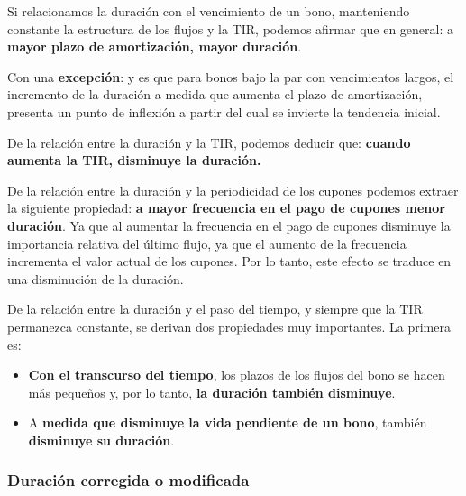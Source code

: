 \documentclass[
  letterpaper,
  DIV=11,
  numbers=noendperiod]{scrreprt}
\begin{document}
\begin{tcolorbox}
Si relacionamos la duración con el vencimiento de un bono, manteniendo
constante la estructura de los flujos y la TIR, podemos afirmar que en
general: a \textbf{mayor plazo de amortización, mayor duración}.

\begin{tcolorbox}[enhanced jigsaw, toprule=.15mm, left=2mm, arc=.35mm, breakable, bottomrule=.15mm, opacityback=0, rightrule=.15mm, leftrule=.75mm, colframe=quarto-callout-important-color-frame, colback=white]
\begin{minipage}[t]{5.5mm}
\textcolor{quarto-callout-important-color}{\faExclamation}
\end{minipage}%
\begin{minipage}[t]{\textwidth - 5.5mm}

Con una \textbf{excepción}: y es que para bonos bajo la par con
vencimientos largos, el incremento de la duración a medida que aumenta
el plazo de amortización, presenta un punto de inflexión a partir del
cual se invierte la tendencia inicial.

\end{minipage}%
\end{tcolorbox}

De la relación entre la duración y la TIR, podemos deducir que:
\textbf{cuando aumenta la TIR, disminuye la duración.}

De la relación entre la duración y la periodicidad de los cupones
podemos extraer la siguiente propiedad: \textbf{a mayor frecuencia en el
pago de cupones menor duración}. Ya que al aumentar la frecuencia en el
pago de cupones disminuye la importancia relativa del último flujo, ya
que el aumento de la frecuencia incrementa el valor actual de los
cupones. Por lo tanto, este efecto se traduce en una disminución de la
duración.

De la relación entre la duración y el paso del tiempo, y siempre que la
TIR permanezca constante, se derivan dos propiedades muy importantes. La
primera es:

\begin{itemize}
\item
  \textbf{Con el transcurso del tiempo}, los plazos de los flujos del
  bono se hacen más pequeños y, por lo tanto, \textbf{la duración
  también disminuye}.
\item
  A \textbf{medida que disminuye la vida pendiente de un bono}, también
  \textbf{disminuye su duración}.
\end{itemize}

\subsubsection{Duración corregida o
modificada}\label{duraciuxf3n-corregida-o-modificada}


\end{tcolorbox}
\end{document}

